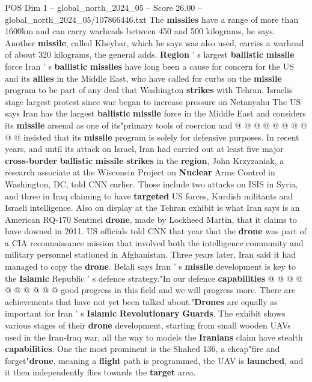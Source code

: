 \begin{textsample}{POS Dim 1 – global\_north\_2024\_05 – Score 26.00 – global\_north\_2024\_05/107866446.txt}
The \textbf{missiles} have a range of more than 1600km and can carry warheads between 450 and 500 kilograms, he says.
Another \textbf{missile}, called Kheybar, which he says was also used, carries a warhead of about 320 kilograms, the general adds. \textbf{Region} ' s largest \textbf{ballistic} \textbf{missile} force Iran ' s \textbf{ballistic} \textbf{missiles} have long been a cause for concern for the US and its \textbf{allies} in the Middle East, who have called for curbs on the \textbf{missile} program to be part of any deal that Washington \textbf{strikes} with Tehran.
Israelis stage largest protest since war began to increase pressure on Netanyahu The US says Iran has the largest \textbf{ballistic} \textbf{missile} force in the Middle East and considers its \textbf{missile} arsenal as one of its"primary tools of coercion and @ @ @ @ @ @ @ @ @ @ insisted that its \textbf{missile} program is solely for defensive purposes.
In recent years, and until its attack on Israel, Iran had carried out at least five major \textbf{cross-border} \textbf{ballistic} \textbf{missile} \textbf{strikes} in the \textbf{region}, John Krzyzaniak, a research associate at the Wisconsin Project on \textbf{Nuclear} Arms Control in Washington, DC, told CNN earlier.
Those include two attacks on ISIS in Syria, and three in Iraq claiming to have \textbf{targeted} US forces, Kurdish militants and Israeli intelligence.
Also on display at the Tehran exhibit is what Iran says is an American RQ-170 Sentinel \textbf{drone}, made by Lockheed Martin, that it claims to have downed in 2011.
US officials told CNN that year that the \textbf{drone} was part of a CIA reconnaissance mission that involved both the intelligence community and military personnel stationed in Afghanistan.
Three years later, Iran said it had managed to copy the \textbf{drone}.
Belali says Iran ' s \textbf{missile} development is key to the \textbf{Islamic} Republic ' s defence strategy."In our defence \textbf{capabilities} @ @ @ @ @ @ @ @ @ @ good progress in this field and we will progress more.
There are achievements that have not yet been talked about."\textbf{Drones} are equally as important for Iran ' s \textbf{Islamic} \textbf{Revolutionary} \textbf{Guards}.
The exhibit shows various stages of their \textbf{drone} development, starting from small wooden UAVs used in the Iran-Iraq war, all the way to models the \textbf{Iranians} claim have stealth \textbf{capabilities}.
One the most prominent is the Shahed 136, a cheap"fire and forget"\textbf{drone}, meaning a \textbf{flight} path is programmed, the UAV is \textbf{launched}, and it then independently flies towards the \textbf{target} area.

\end{textsample}
